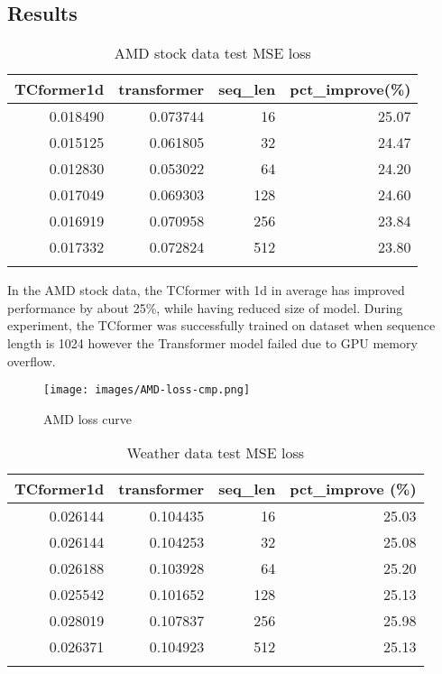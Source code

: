 \documentclass[10pt,journal,compsoc]{IEEEtran}
\begin{document}
\subsection{Results}

\begin{table}[h]
\centering
\begin{tabular}{rrrr}
\toprule
TCformer1d & transformer & seq\_len & pct\_improve(\%) \\
\midrule
0.018490 & 0.073744 & 16 & 25.07 \\
0.015125 & 0.061805 & 32 & 24.47 \\
0.012830 & 0.053022 & 64 & 24.20 \\
0.017049 & 0.069303 & 128 & 24.60 \\
0.016919 & 0.070958 & 256 & 23.84 \\
0.017332 & 0.072824 & 512 & 23.80 \\
\bottomrule \\
\end{tabular}
\caption{AMD stock data test MSE loss}
\label{tab:comparison}
\end{table}

In the AMD stock data, the TCformer with 1d in average has improved performance by about 25\%, while having reduced size of model. During experiment, the TCformer was successfully trained on dataset when sequence length is 1024 however the Transformer model failed due to GPU memory overflow.  

\begin{figure}[h]
    \centering
    \texttt{[image: images/AMD-loss-cmp.png]}
    \caption{AMD loss curve}
    \label{fig:AMD-loss-curve}
\end{figure}

\begin{table}[h]
\centering
\begin{tabular}{rrrr}
\toprule
TCformer1d & transformer & seq\_len & pct\_improve (\%) \\
\midrule
0.026144 & 0.104435 & 16 & 25.03 \\
0.026144 & 0.104253 & 32 & 25.08 \\
0.026188 & 0.103928 & 64 & 25.20 \\
0.025542 & 0.101652 & 128 & 25.13 \\
0.028019 & 0.107837 & 256 & 25.98 \\
0.026371 & 0.104923 & 512 & 25.13 \\
\bottomrule\\
\end{tabular}
\caption{Weather data test MSE loss}
\label{tab:comparison}
\end{table}
\end{document}
